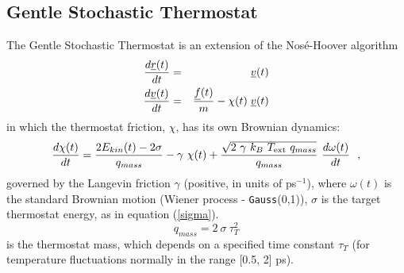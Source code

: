 \subsection{Gentle Stochastic Thermostat}

The Gentle Stochastic Thermostat \cite{leimkuhler-09a,samoletov-07a} is
an extension of the Nos\'e-Hoover algorithm \cite{hoover-85a}
\begin{eqnarray}
{d \mbox{$\underline{r}$}(t) \over d t} &=& \mbox{$\underline{v}$}(t) \nonumber \\
{d \mbox{$\underline{v}$}(t) \over d t} &=& {\mbox{$\underline{f}$}(t) \over m} - \chi (t) \; \mbox{$\underline{v}$}(t)
\end{eqnarray}
in which the thermostat friction, $\chi$, has its own Brownian dynamics:
\begin{equation}
{d \chi (t) \over dt} = \frac{2 E_{kin}(t) - 2 \sigma}{q_{mass}} - \gamma~\chi(t) +
\frac{\sqrt{2~\gamma~k_{B}~T_{\rm ext}~q_{mass}}}{q_{mass}}~{d \omega(t) \over d t}~~, \label{Ornstein-Uhlenbeck}
\end{equation}
governed by the Langevin friction $\gamma$ (positive, in units of ps$^{-1}$),
where $\omega(t)$ is the standard Brownian motion (Wiener process - {\tt Gauss}(0,1)),
$\sigma$ is the target thermostat energy, as in equation (\ref{sigma}).
\begin{equation}
q_{mass} = 2~\sigma~\tau_{T}^{2}
\end{equation}
is the thermostat mass, which depends on a specified time constant
$\tau_{T}$ (for temperature fluctuations normally in the range [0.5,
2] ps).

